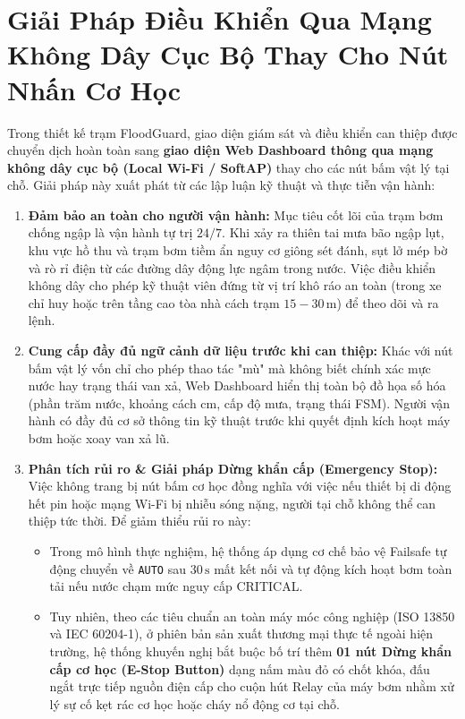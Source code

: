\section{Giải Pháp Điều Khiển Qua Mạng Không Dây Cục Bộ Thay Cho Nút Nhấn Cơ Học}

Trong thiết kế trạm FloodGuard, giao diện giám sát và điều khiển can thiệp được chuyển dịch hoàn toàn sang \textbf{giao diện Web Dashboard thông qua mạng không dây cục bộ (Local Wi-Fi / SoftAP)} thay cho các nút bấm vật lý tại chỗ. Giải pháp này xuất phát từ các lập luận kỹ thuật và thực tiễn vận hành:
\begin{enumerate}
    \item \textbf{Đảm bảo an toàn cho người vận hành:} Mục tiêu cốt lõi của trạm bơm chống ngập là vận hành tự trị $24/7$. Khi xảy ra thiên tai mưa bão ngập lụt, khu vực hồ thu và trạm bơm tiềm ẩn nguy cơ giông sét đánh, sụt lở mép bờ và rò rỉ điện từ các đường dây động lực ngâm trong nước. Việc điều khiển không dây cho phép kỹ thuật viên đứng từ vị trí khô ráo an toàn (trong xe chỉ huy hoặc trên tầng cao tòa nhà cách trạm $15 - 30\,\text{m}$) để theo dõi và ra lệnh.
    \item \textbf{Cung cấp đầy đủ ngữ cảnh dữ liệu trước khi can thiệp:} Khác với nút bấm vật lý vốn chỉ cho phép thao tác "mù" mà không biết chính xác mực nước hay trạng thái van xả, Web Dashboard hiển thị toàn bộ đồ họa số hóa (phần trăm nước, khoảng cách cm, cấp độ mưa, trạng thái FSM). Người vận hành có đầy đủ cơ sở thông tin kỹ thuật trước khi quyết định kích hoạt máy bơm hoặc xoay van xả lũ.
    \item \textbf{Phân tích rủi ro \& Giải pháp Dừng khẩn cấp (Emergency Stop):}
    Việc không trang bị nút bấm cơ học đồng nghĩa với việc nếu thiết bị di động hết pin hoặc mạng Wi-Fi bị nhiễu sóng nặng, người tại chỗ không thể can thiệp tức thời. Để giảm thiểu rủi ro này:
    \begin{itemize}
        \item Trong mô hình thực nghiệm, hệ thống áp dụng cơ chế bảo vệ Failsafe tự động chuyển về \texttt{AUTO} sau $30\,\text{s}$ mất kết nối và tự động kích hoạt bơm toàn tải nếu nước chạm mức nguy cấp CRITICAL.
        \item Tuy nhiên, theo các tiêu chuẩn an toàn máy móc công nghiệp (ISO 13850 và IEC 60204-1), ở phiên bản sản xuất thương mại thực tế ngoài hiện trường, hệ thống khuyến nghị bắt buộc bố trí thêm \textbf{01 nút Dừng khẩn cấp cơ học (E-Stop Button)} dạng nấm màu đỏ có chốt khóa, đấu ngắt trực tiếp nguồn điện cấp cho cuộn hút Relay của máy bơm nhằm xử lý sự cố kẹt rác cơ học hoặc cháy nổ động cơ tại chỗ.
    \end{itemize}
\end{enumerate}

